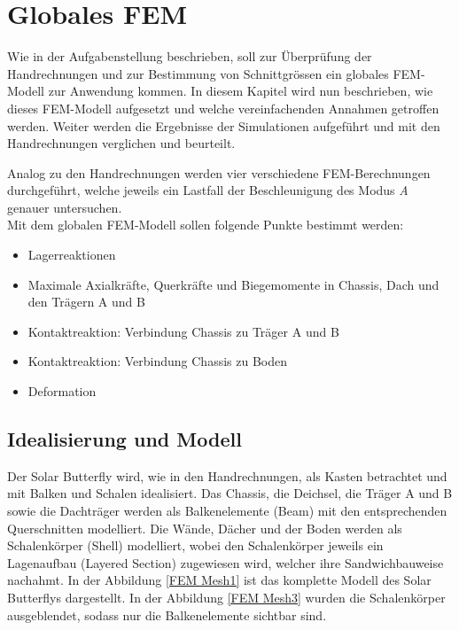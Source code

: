 \section{Globales FEM}
Wie in der Aufgabenstellung beschrieben, soll zur Überprüfung der Handrechnungen und zur Bestimmung von Schnittgrössen ein globales FEM-Modell zur Anwendung kommen. In diesem Kapitel wird nun beschrieben, wie dieses FEM-Modell aufgesetzt und welche vereinfachenden Annahmen getroffen werden. Weiter werden die Ergebnisse der Simulationen aufgeführt und mit den Handrechnungen verglichen und beurteilt.

Analog zu den Handrechnungen werden vier verschiedene FEM-Berechnungen durchgeführt, welche jeweils ein Lastfall der Beschleunigung des Modus \emph{A} genauer untersuchen.\\

Mit dem globalen FEM-Modell sollen folgende Punkte bestimmt werden:
\begin{itemize}
  \item Lagerreaktionen
  \item Maximale Axialkräfte, Querkräfte und Biegemomente in Chassis, Dach und den Trägern A und B
  \item Kontaktreaktion: Verbindung Chassis zu Träger A und B
  \item Kontaktreaktion: Verbindung Chassis zu Boden
  \item Deformation
\end{itemize}

\subsection{Idealisierung und Modell}
Der Solar Butterfly wird, wie in den Handrechnungen, als \glqq Kasten\grqq{} betrachtet und mit Balken und Schalen idealisiert. Das Chassis, die Deichsel, die Träger A und B sowie die Dachträger werden als Balkenelemente (Beam) mit den entsprechenden Querschnitten modelliert. Die Wände, Dächer und der Boden werden als Schalenkörper (Shell) modelliert, wobei den Schalenkörper jeweils ein Lagenaufbau (Layered Section) zugewiesen wird, welcher ihre Sandwichbauweise nachahmt. In der Abbildung \ref{FEM Mesh1} ist das komplette Modell des Solar Butterflys dargestellt. In der Abbildung \ref{FEM Mesh3} wurden die Schalenkörper ausgeblendet, sodass nur die Balkenelemente sichtbar sind.

